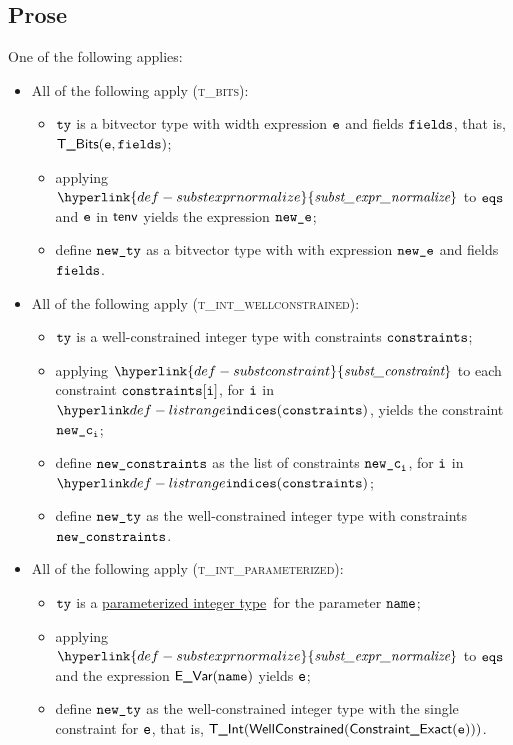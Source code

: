 \documentclass{book}
\newcommand\substexprnormalize[0]{\hyperlink{def-substexprnormalize}{\textfunc{subst\_expr\_normalize}}}
\newcommand\substconstraint[0]{\hyperlink{def-substconstraint}{\textfunc{subst\_constraint}}}
\newcommand\parameterizedintegertype[0]{\hyperlink{def-parameterizedintegertype}{parameterized integer type}}
\begin{document}
\subsection{Prose}
One of the following applies:
\begin{itemize}
  \item All of the following apply (\textsc{t\_bits}):
  \begin{itemize}
    \item $\texttt{ty}$ is a bitvector type with width expression $\texttt{e}$ and fields $\texttt{fields}$, that is, $\textsf{T\_Bits}(\texttt{e}, \texttt{fields})$;
    \item applying $\substexprnormalize$ to $\texttt{eqs}$ and $\texttt{e}$ in $\textsf{tenv}$ yields the expression $\texttt{new\_e}$;
    \item define $\texttt{new\_ty}$ as a bitvector type with with expression $\texttt{new\_e}$ and fields $\texttt{fields}$.
  \end{itemize}

  \item All of the following apply (\textsc{t\_int\_wellconstrained}):
  \begin{itemize}
    \item $\texttt{ty}$ is a well-constrained integer type with constraints $\texttt{constraints}$;
    \item applying $\substconstraint$ to each constraint $\texttt{constraints}[\texttt{i}]$, for $\texttt{i}$ in \\
          $\listrange(\constraints)$, yields the constraint $\texttt{new\_c}_{\texttt{i}}$;
    \item define $\texttt{new\_constraints}$ as the list of constraints $\texttt{new\_c}_{\texttt{i}}$, for $\texttt{i}$ in \\
          $\listrange(\constraints)$;
    \item define $\texttt{new\_ty}$ as the well-constrained integer type with constraints \\
          $\texttt{new\_constraints}$.
  \end{itemize}

  \item All of the following apply (\textsc{t\_int\_parameterized}):
  \begin{itemize}
    \item $\texttt{ty}$ is a \parameterizedintegertype\ for the parameter $\texttt{name}$;
    \item applying $\substexprnormalize$ to $\texttt{eqs}$ and the expression $\textsf{E\_Var}(\texttt{name})$ yields $\texttt{e}$;
    \item define $\texttt{new\_ty}$ as the well-constrained integer type with the single constraint for $\texttt{e}$, that is,
          $\textsf{T\_Int}(\textsf{WellConstrained}(\textsf{Constraint\_Exact}(\texttt{e})))$.
  \end{itemize}


\end{itemize}
\end{document}
